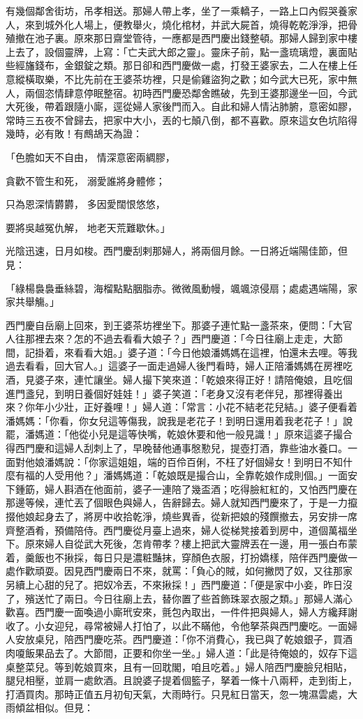 \begin{showcontents}{}
有幾個鄰舍街坊，吊孝相送。那婦人帶上孝，坐了一乘轎子，一路上口內假哭養家人，來到城外化人場上，便教舉火，燒化棺材，并武大屍首，燒得乾乾淨淨，把骨殖撤在池子裏。原來那日齋堂管待，一應都是西門慶出錢整頓。那婦人歸到家中樓上去了，設個靈牌，上寫：「亡夫武大郎之靈」。靈床子前，點一盞琉璃燈，裏面貼些經旛錢布，金銀錠之類。那日卻和西門慶做一處，打發王婆家去，二人在樓上任意縱橫取樂，不比先前在王婆茶坊裡，只是偷雞盜狗之歡；如今武大已死，家中無人，兩個恣情肆意停眠整宿。初時西門慶恐鄰舍瞧破，先到王婆那邊坐一回，今武大死後，帶着跟隨小廝，逕從婦人家後門而入。自此和婦人情沾肺腑，意密如膠，常時三五夜不曾歸去，把家中大小，丟的七顛八倒，都不喜歡。原來這女色坑陷得幾時，必有敗！有鷓鴣天為證：

「色膽如天不自由，  情深意密兩綢膠，

貪歡不管生和死，  溺愛誰將身體修；

只為恩深情欝欝，  多因愛闊恨悠悠，

要將吳越冤仇解，  地老天荒難歇休。」

光陰迅速，日月如梭。西門慶刮剌那婦人，將兩個月餘。一日將近端陽佳節，但見：

「綠楊裊裊垂絲碧，海榴點點胭脂赤。微微風動幔，颯颯涼侵扇；處處遇端陽，家家共舉觴。」

西門慶自岳廟上回來，到王婆茶坊裡坐下。那婆子連忙點一盞茶來，便問：「大官人往那裡去來？怎的不過去看看大娘子？」西門慶道：「今日往廟上走走，大節間，記掛着，來看看大姐。」婆子道：「今日他娘潘媽媽在這裡，怕還未去哩。等我過去看看，回大官人。」這婆子一面走過婦人後門看時，婦人正陪潘媽媽在房裡吃酒，見婆子來，連忙讓坐。婦人撮下笑來道：「乾娘來得正好！請陪俺娘，且吃個進門盞兒，到明日養個好娃娃！」婆子笑道：「老身又沒有老伴兒，那裡得養出來？你年小少壯，正好養哩！」婦人道：「常言：小花不結老花兒結。」婆子便看着潘媽媽：「你看，你女兒這等傷我，說我是老花子！到明日還用着我老花子！」說罷，潘媽道：「他從小兒是這等快嘴，乾娘休要和他一般見識！」原來這婆子撮合得西門慶和這婦人刮刺上了，早晚替他通事慇懃兒，提壺打酒，靠些油水養口。一面對他娘潘媽說：「你家這姐姐，端的百伶百俐，不枉了好個婦女！到明日不知什麼有福的人受用他？」潘媽媽道：「乾娘既是撮合山，全靠乾娘作成則個。」一面安下鍾筯，婦人斟酒在他面前，婆子一連陪了幾盃酒；吃得臉紅紅的，又怕西門慶在那邊等候，連忙丟了個眼色與婦人，告辭歸去。婦人就知西門慶來了，于是一力攛掇他娘起身去了，將房中收拾乾淨，燒些異香，從新把娘的殘饌撤去，另安排一席齊整酒肴，預備陪侍。西門慶從月臺上過來，婦人從梯凳接着到房中，道個萬福坐下。原來婦人自從武大死後，怎肯帶孝？樓上把武大靈牌丟在一邊，用一張白布蒙着，羹飯也不揪採，每日只是濃粧豔抹，穿顏色衣服，打扮嬌樣，陪伴西門慶做一處作歡頑耍。因見西門慶兩日不來，就罵：「負心的賊，如何撇閃了奴，又往那家另續上心甜的兒了。把奴冷丟，不來揪採！」西門慶道：「便是家中小妾，昨日沒了，殯送忙了兩日。今日往廟上去，替你置了些首飾珠翠衣服之類。」那婦人滿心歡喜。西門慶一面喚過小廝玳安來，氈包內取出，一件件把與婦人，婦人方纔拜謝收了。小女迎兒，尋常被婦人打怕了，以此不瞞他，令他拏茶與西門慶吃。一面婦人安放桌兒，陪西門慶吃茶。西門慶道：「你不消費心，我已與了乾娘銀子，買酒肉嗄飯果品去了。大節間，正要和你坐一坐。」婦人道：「此是待俺娘的，奴存下這桌整菜兒。等到乾娘買來，且有一回耽閣，咱且吃着。」婦人陪西門慶臉兒相貼，腿兒相壓，並肩一處飲酒。且說婆子提着個籃子，拏着一條十八兩秤，走到街上，打酒買肉。那時正值五月初旬天氣，大雨時行。只見紅日當天，忽一塊濕雲處，大雨傾盆相似。但見：


\end{showcontents}

